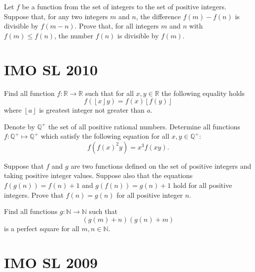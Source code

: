 \documentclass[11pt]{scrartcl}
\begin{document}
\begin{Problem}
Let $f$ be a function from the set of integers to the set of positive integers. Suppose that, for any two integers $m$ and $n$, the difference $f(m) - f(n)$ is divisible by $f(m- n)$. Prove that, for all integers $m$ and $n$ with $f(m) \leq f(n)$, the number $f(n)$ is divisible by $f(m)$.
\end{Problem}



\section{IMO SL 2010}

\begin{Problem}
Find all function $f:\mathbb{R}\rightarrow\mathbb{R}$ such that for all $x,y\in\mathbb{R}$ the following equality holds\[
f(\left\lfloor x\right\rfloor y)=f(x)\left\lfloor f(y)\right\rfloor \]where $\left\lfloor a\right\rfloor $ is greatest integer not greater than $a.$
\end{Problem}


\begin{Problem}
Denote by $\mathbb{Q}^+$ the set of all positive rational numbers. Determine all functions $f : \mathbb{Q}^+ \mapsto \mathbb{Q}^+$ which satisfy the following equation for all $x, y \in \mathbb{Q}^+:$\[f\left( f(x)^2y \right) = x^3 f(xy).\]
\end{Problem}


\begin{Problem}
Suppose that $f$ and $g$ are two functions defined on the set of positive integers and taking positive integer values. Suppose also that the equations $f(g(n)) = f(n) + 1$ and $g(f(n)) = g(n) + 1$ hold for all positive integers. Prove that $f(n) = g(n)$ for all positive integer $n.$
\end{Problem}


\begin{Problem}
Find all functions $g:\mathbb{N}\rightarrow\mathbb{N}$ such that\[\left(g(m)+n\right)\left(g(n)+m\right)\]is a perfect square for all $m,n\in\mathbb{N}.$
\end{Problem}


\section{IMO SL 2009}
\end{document}
